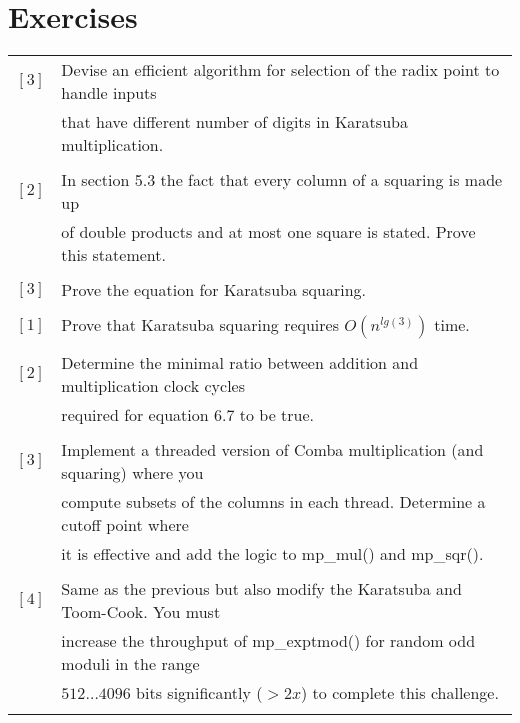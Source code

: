 \documentclass[b5paper]{book}
\begin{document}
\section*{Exercises}
\begin{tabular}{cl}
$\left [ 3 \right ] $ & Devise an efficient algorithm for selection of the radix point to handle inputs \\
                      & that have different number of digits in Karatsuba multiplication. \\
                      & \\
$\left [ 2 \right ] $ & In section 5.3 the fact that every column of a squaring is made up \\
                      & of double products and at most one square is stated.  Prove this statement. \\
                      & \\                      
$\left [ 3 \right ] $ & Prove the equation for Karatsuba squaring. \\
                      & \\
$\left [ 1 \right ] $ & Prove that Karatsuba squaring requires $O \left (n^{lg(3)} \right )$ time. \\
                      & \\ 
$\left [ 2 \right ] $ & Determine the minimal ratio between addition and multiplication clock cycles \\
                      & required for equation $6.7$ to be true.  \\
                      & \\
$\left [ 3 \right ] $ & Implement a threaded version of Comba multiplication (and squaring) where you \\
                      & compute subsets of the columns in each thread.  Determine a cutoff point where \\
                      & it is effective and add the logic to mp\_mul() and mp\_sqr(). \\
                      &\\
$\left [ 4 \right ] $ & Same as the previous but also modify the Karatsuba and Toom-Cook.  You must \\
                      & increase the throughput of mp\_exptmod() for random odd moduli in the range \\
                      & $512 \ldots 4096$ bits significantly ($> 2x$) to complete this challenge. \\
                      & \\
\end{tabular}
\end{document}
